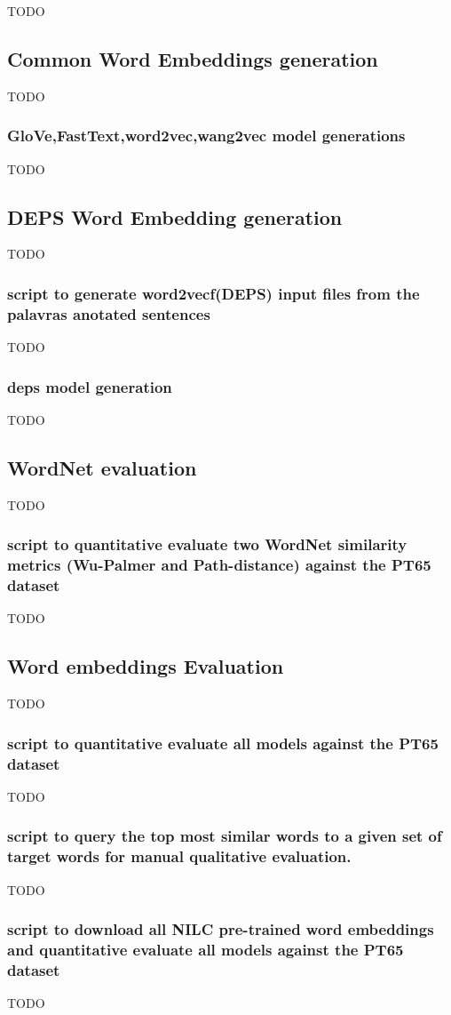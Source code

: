 TODO

\subsection{Common Word Embeddings generation}

TODO

\subsubsection{GloVe,FastText,word2vec,wang2vec model generations}

TODO

\subsection{DEPS Word Embedding generation}

TODO

\subsubsection{script to generate word2vecf(DEPS) input files from the palavras anotated sentences}

TODO

\subsubsection{deps model generation}

TODO

\subsection{WordNet evaluation}

TODO

\subsubsection{script to quantitative evaluate two WordNet similarity metrics (Wu-Palmer and Path-distance) against the PT65 dataset}

TODO

\subsection{Word embeddings Evaluation}

TODO

\subsubsection{script to quantitative evaluate all models against the PT65 dataset}

TODO

\subsubsection{script to query the top most similar words to a given set of target words for manual qualitative evaluation.}

TODO

\subsubsection{script to download all NILC pre-trained word embeddings and quantitative evaluate all models against the PT65 dataset}

TODO
